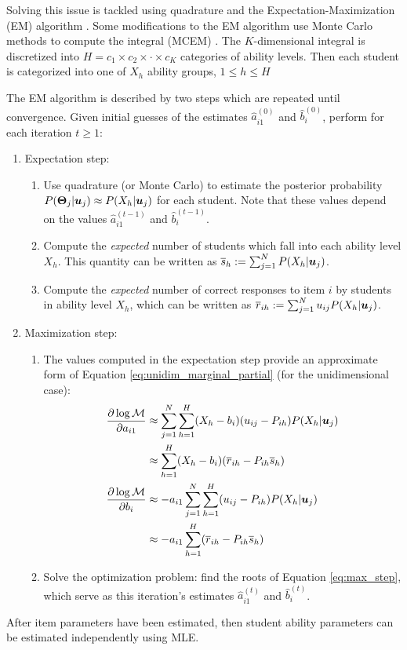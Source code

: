 Solving this issue is tackled using quadrature and the Expectation-Maximization (EM) algorithm  \cite{dempster1977} \cite{bock1981}. Some modifications to the EM algorithm use Monte Carlo methods to compute the integral (MCEM) \cite{meng_schilling1996}. The $K$-dimensional integral is discretized into $H = c_1 \times c_2 \times \cdot \times c_K$ categories of ability levels. Then each student is categorized into one of $X_h$ ability groups, $1\leq h \leq H$

The EM algorithm is described by two steps which are repeated until convergence. Given initial guesses of the estimates $\hat a_{i1}^{(0)}$ and $\hat b_i^{(0)}$, perform for each iteration $t\geq 1$:
\begin{enumerate}
  \item Expectation step:
    \begin{enumerate}
      \item Use quadrature (or Monte Carlo) to estimate the posterior probability $P(\boldsymbol{\Theta}_j | \boldsymbol{u}_j) \approx P(X_h | \boldsymbol{u}_j)$ for each student. Note that these values depend on the values $\hat a_{i1}^{(t-1)}$ and $\hat b_i^{(t-1)}$.
      \item Compute the \textit{expected} number of students which fall into each ability level $X_h$. This quantity can be written as $\overline{s}_h:=\sum_{j=1}^N P(X_h | \boldsymbol{u}_j)$. 
      \item Compute the \textit{expected} number of correct responses to item $i$ by students in ability level $X_h$, which can be written as $\overline{r}_{ih}:=\sum_{j=1}^N u_{ij} P(X_h | \boldsymbol{u}_j)$.
    \end{enumerate}
  \item Maximization step:
    \begin{enumerate}
      \item The values computed in the expectation step provide an approximate form of Equation \ref{eq:unidim_marginal_partial} (for the unidimensional case):
  \begin{equation}
          \begin{split}
            \frac{\partial \log \mathcal{M}}{\partial a_{i1}} &\approx \sum_{j=1}^N \sum_{h=1}^H (X_h - b_i)(u_{ij} - P_{ih}) P(X_h | \boldsymbol{u}_j) \\
          &\approx \sum_{h=1}^H (X_h - b_i)(\overline{r}_{ih} - P_{ih}\overline{s}_h) \\
          \frac{\partial \log \mathcal{M}}{\partial b_i} &\approx -a_{i1} \sum_{j=1}^N \sum_{h=1}^H (u_{ij} - P_{ih}) P(X_h| \boldsymbol{u}_j) \\
          &\approx -a_{i1} \sum_{h=1}^H (\overline{r}_{ih} -P_{ih}\overline{s}_h)
\end{split}
          \label{eq:max_step}
        \end{equation}
      \item Solve the optimization problem: find the roots of Equation \ref{eq:max_step}, which serve as this iteration's estimates $\hat a_{i1}^{(t)}$ and $\hat b_i^{(t)}$.
    \end{enumerate}
\end{enumerate}
After item parameters have been estimated, then student ability parameters can be estimated independently using MLE.


